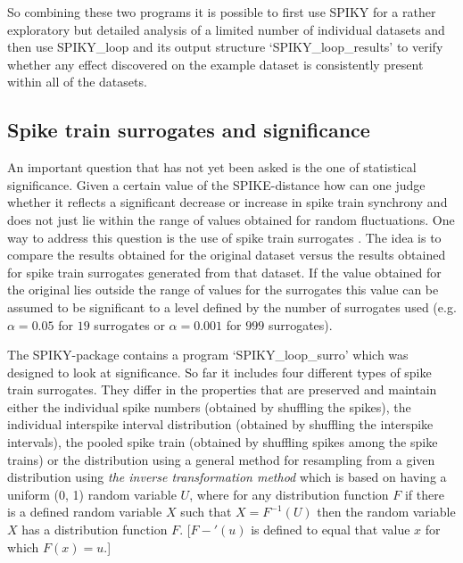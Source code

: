 \documentclass[10pt,twocolumn]{elsart5p}
\begin{document}
So combining these two programs it is possible to first use SPIKY for a rather exploratory but detailed analysis of a limited number of individual datasets and then use SPIKY\_loop and its output structure `SPIKY\_loop\_results' to verify whether any effect discovered on the example dataset is consistently present within all of the datasets.


\subsection{\label{ss:Spike-train-surrogates} Spike train surrogates and significance}

An important question that has not yet been asked is the one of statistical significance. Given a certain value of the SPIKE-distance how can one judge whether it reflects a significant decrease or increase in spike train synchrony and does not just lie within the range of values obtained for random fluctuations. One way to address this question is the use of spike train surrogates \citep{Kass05, Gruen09, Louis10}. The idea is to compare the results obtained for the original dataset versus the results obtained for spike train surrogates generated from that dataset. If the value obtained for the original lies outside the range of values for the surrogates this value can be assumed to be significant to a level defined by the number of surrogates used (e.g. $\alpha = 0.05$ for $19$ surrogates or $\alpha = 0.001$ for $999$ surrogates).


The SPIKY-package contains a program `SPIKY\_loop\_surro' which was designed to look at significance. So far it includes four different types of spike train surrogates. They differ in the properties that are preserved and maintain either the individual spike numbers (obtained by shuffling the spikes), the individual interspike interval distribution (obtained by shuffling the interspike intervals), the pooled spike train (obtained by shuffling spikes among the spike trains) or the distribution using a general method for resampling from a given distribution using {\it the inverse transformation method} which is based on having a uniform (0, 1) random variable $U$, where for any distribution function $F$ if there is a defined random variable $X$ such that $X = F^{-1}(U)$ then the random variable $X$ has a distribution function $F$. [$F-'(u)$ is defined to equal that value $x$ for which $F(x) = u.$]
\end{document}
